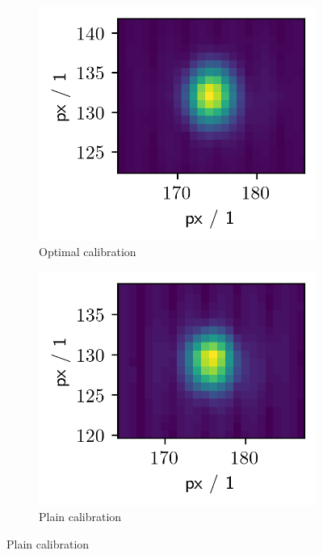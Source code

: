 \documentclass[twoside,openright]{scrreprt}
\begin{document}
\begin{figure}[hbtp]
\centering
\begin{subfigure}[b]{0.32\linewidth}
\includegraphics[scale=1]{images/CalibComparison/fullOptimizedComparisonCalib.png} 
\caption{Optimal calibration}
\end{subfigure}\hfill
\begin{subfigure}[b]{0.32\linewidth}
\includegraphics[scale=1]{images/CalibComparison/betterComparisonCalib.png} 
\caption{Plain calibration}
\end{subfigure}\hfill

\end{figure}
\end{document}
